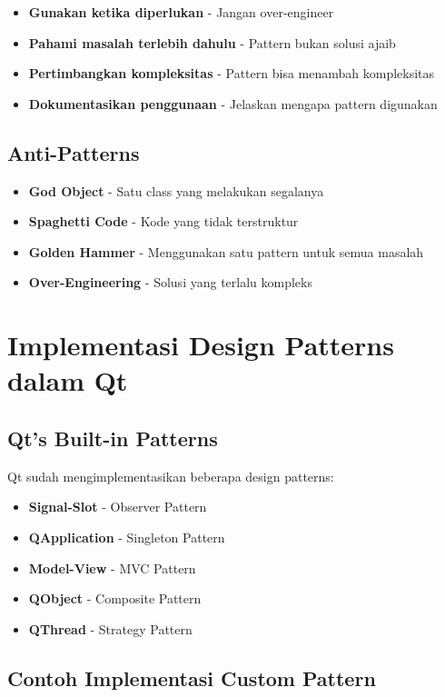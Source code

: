 \begin{itemize}
\item \textbf{Gunakan ketika diperlukan} - Jangan over-engineer
\item \textbf{Pahami masalah terlebih dahulu} - Pattern bukan solusi ajaib
\item \textbf{Pertimbangkan kompleksitas} - Pattern bisa menambah kompleksitas
\item \textbf{Dokumentasikan penggunaan} - Jelaskan mengapa pattern digunakan
\end{itemize}

\subsection{Anti-Patterns}

\begin{itemize}
\item \textbf{God Object} - Satu class yang melakukan segalanya
\item \textbf{Spaghetti Code} - Kode yang tidak terstruktur
\item \textbf{Golden Hammer} - Menggunakan satu pattern untuk semua masalah
\item \textbf{Over-Engineering} - Solusi yang terlalu kompleks
\end{itemize}

\section{Implementasi Design Patterns dalam Qt}

\subsection{Qt's Built-in Patterns}

Qt sudah mengimplementasikan beberapa design patterns:

\begin{itemize}
\item \textbf{Signal-Slot} - Observer Pattern
\item \textbf{QApplication} - Singleton Pattern
\item \textbf{Model-View} - MVC Pattern
\item \textbf{QObject} - Composite Pattern
\item \textbf{QThread} - Strategy Pattern
\end{itemize}

\subsection{Contoh Implementasi Custom Pattern}

